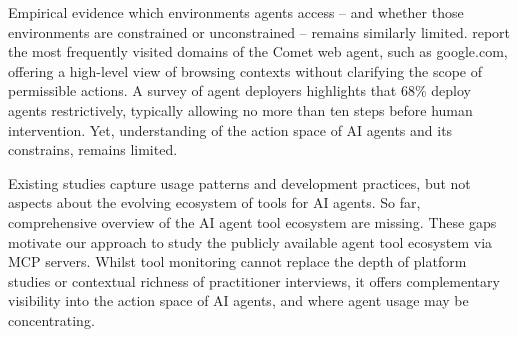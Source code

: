 \documentclass[manuscript,screen,nonacm,oneside]{acmart}
\begin{document}
Empirical evidence which environments agents access -- and whether those environments are constrained or unconstrained -- remains similarly limited. \citep{perplexityCometBrowser} report the most frequently visited domains of the Comet web agent, such as google.com, offering a high-level view of browsing contexts without clarifying the scope of permissible actions. A survey of agent deployers \citep{pan2025measuring} highlights that 68\% deploy agents restrictively, typically allowing no more than ten steps before human intervention. Yet, understanding of the action space of AI agents and its constrains, remains limited.

Existing studies capture usage patterns and development practices, but not aspects about the evolving ecosystem of tools for AI agents. So far, comprehensive overview of the AI agent tool ecosystem are missing. These gaps motivate our approach to study the publicly available agent tool ecosystem via MCP servers. Whilst tool monitoring cannot replace the depth of platform studies or contextual richness of practitioner interviews, it offers complementary visibility into the action space of AI agents, and where agent usage may be concentrating. 
\end{document}
